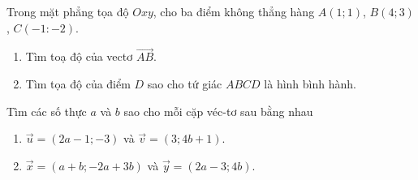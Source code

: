 \begin{bt}%
	Trong mặt phẳng tọa độ $Oxy$, cho ba điểm không thẳng hàng $A(1;1)$, $B(4;3)$, $C(-1:-2)$.
	\begin{enumerate}
		\item Tìm toạ độ của vectơ $\overrightarrow{AB}$.
		\item Tìm tọa độ của điểm $D$ sao cho tứ giác $ABCD$ là hình bình hành.
	\end{enumerate}
\end{bt}

\begin{bt}%
	Tìm các số thực $a$ và $b$ sao cho mỗi cặp véc-tơ sau bằng nhau
	\begin{enumerate}
		\item $\overrightarrow{u}=(2a-1;-3)$ và $\overrightarrow{v}=(3;4b+1)$.
		\item $\overrightarrow{x}=(a+b;-2a+3b)$ và $\overrightarrow{y}=(2a-3;4b)$.
	\end{enumerate}
\end{bt}

